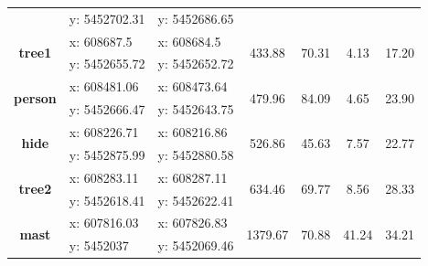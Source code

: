 \begin{table}[!h]
\begin{tabular}{crrcccc}
		& \multicolumn{1}{l}{y: 5452702.31} & \multicolumn{1}{l}{y: 5452686.65} &       &       &       &  \\
		\multirow{2}[0]{*}{\textbf{tree1}} & \multicolumn{1}{l}{x: 608687.5} & \multicolumn{1}{l}{x: 608684.5} & \multirow{2}[0]{*}{433.88} & \multirow{2}[0]{*}{70.31} & \multirow{2}[0]{*}{4.13} & \multirow{2}[0]{*}{17.20} \\
		& \multicolumn{1}{l}{y: 5452655.72} & \multicolumn{1}{l}{y: 5452652.72} &       &       &       &  \\
		\multirow{2}[0]{*}{\textbf{person}} & \multicolumn{1}{l}{x: 608481.06} & \multicolumn{1}{l}{x: 608473.64} & \multirow{2}[0]{*}{479.96} & \multirow{2}[0]{*}{84.09} & \multirow{2}[0]{*}{4.65} & \multirow{2}[0]{*}{23.90} \\
		& \multicolumn{1}{l}{y: 5452666.47} & \multicolumn{1}{l}{y: 5452643.75} &       &       &       &  \\
		\multirow{2}[0]{*}{\textbf{hide}} & \multicolumn{1}{l}{x: 608226.71} & \multicolumn{1}{l}{x: 608216.86} & \multirow{2}[0]{*}{526.86} & \multirow{2}[0]{*}{45.63} & \multirow{2}[0]{*}{7.57} & \multirow{2}[0]{*}{22.77} \\
		& \multicolumn{1}{l}{y: 5452875.99} & \multicolumn{1}{l}{y: 5452880.58} &       &       &       &  \\
		\multirow{2}[0]{*}{\textbf{tree2}} & \multicolumn{1}{l}{x: 608283.11} & \multicolumn{1}{l}{x: 608287.11} & \multirow{2}[0]{*}{634.46} & \multirow{2}[0]{*}{69.77} & \multirow{2}[0]{*}{8.56} & \multirow{2}[0]{*}{28.33} \\
		& \multicolumn{1}{l}{y: 5452618.41} & \multicolumn{1}{l}{y: 5452622.41} &       &       &       &  \\
		\multirow{2}[0]{*}{\textbf{mast}} & \multicolumn{1}{l}{x: 607816.03} & \multicolumn{1}{l}{x: 607826.83} & \multirow{2}[0]{*}{1379.67} & \multirow{2}[0]{*}{70.88} & \multirow{2}[0]{*}{41.24} & \multirow{2}[0]{*}{34.21} \\
		& \multicolumn{1}{l}{y: 5452037} & \multicolumn{1}{l}{y: 5452069.46} &       &       &       &  \\
		\bottomrule
	\end{tabular}
	\label{tab:static_targets_zebetin}
\end{table}


